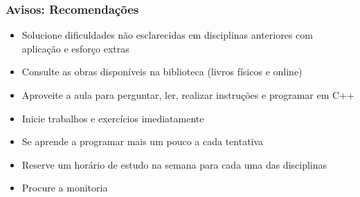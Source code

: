 \documentclass[aspectratio=169]{beamer}
\begin{document}
\begin{frame}\frametitle{Avisos: Recomendações}
\begin{itemize}
	\item Solucione dificuldades não esclarecidas em disciplinas anteriores com aplicação e esforço extras
	\item Consulte as obras disponíveis na biblioteca (livros físicos e online)
	\item Aproveite a aula para perguntar, ler, realizar instruções e programar em C++
	\item Inicie trabalhos e exercícios imediatamente
	\item Se aprende a programar mais um pouco a cada tentativa
	\item Reserve um horário de estudo na semana para cada uma das disciplinas
	\item Procure a monitoria  
\end{itemize}
\end{frame}
\end{document}
